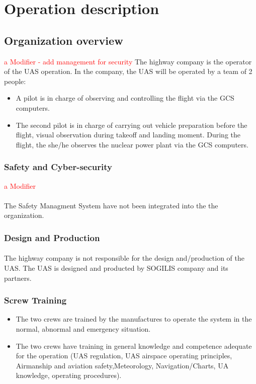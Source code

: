 \documentclass[]{article}
\begin{document}
	\section{Operation description}
	
	\subsection{Organization overview} \textcolor{red}{a Modifier - add management for security}
    The highway company is the operator of the UAS operation. In the company, the UAS will be operated by a team of 2 people:
    \begin{itemize}
    	\item A pilot is in charge of observing and controlling the flight via the GCS computers. 
    	\item The second pilot is in charge of carrying out vehicle preparation before the flight, visual observation during takeoff and landing moment. During the flight, the she/he observes the nuclear power plant via the GCS computers.
	\end{itemize}
	\subsubsection{Safety and Cyber-security} \textcolor{red}{a Modifier}
	\paragraph {} The Safety Managment System have not been integrated into the the organization.
	\subsubsection {Design and Production} 
	\paragraph{} The highway company is not responsible for the design and/production of the UAS. The UAS is designed and producted by SOGILIS company and its partners.
	
	\subsubsection{Screw Training}
	\begin{itemize}
		\item The two crews are trained by the manufactures to operate the system in the normal, abnormal and emergency situation. 
		\item The two crews have training in general knowledge and competence adequate for the operation (UAS regulation, UAS airspace operating principles, Airmanship and aviation safety,Meteorology, Navigation/Charts, UA knowledge, operating procedures). 
	\end{itemize}
	
\end{document}
